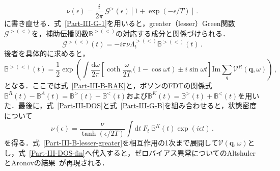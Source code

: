 \documentclass[a4paper,11pt]{ltjsarticle}
\def\d{\mathrm{d}}
\def\qo{(\mathbf{q},\omega)}
\begin{document}
\begin{equation}\label{Part-III-DOS}
\nu(\epsilon)=\frac{i}{2\pi}\ \mathcal{G}^{>}
(\epsilon)[1+\exp(-\epsilon/T)]\,.
\end{equation}
に書き直せる．式~\eqref{Part-III-G-1}を用いると，greater（lesser）Green関数$\mathcal{G}^{>(<)}$を，補助伝播関数$\mathbb{B}^{>(<)}$の対応する成分と関係づけられる．
\begin{equation}\label{Part-III-G-B}
\mathcal{G}^{>(<)}(t)=-i\pi\nu\Lambda^{>(<)}_{t}\mathbb{B}^{>(<)}(t)\,.
\end{equation}
後者を具体的に求めると，
\begin{equation}\label{Part-III-B-lesser-greater}
\mathbb{B}^{>(<)}(t)=\frac{1}{2}\exp\left(\int\frac{\d\omega}{2\pi}
\left[\coth\frac{\omega}{2T}(1-\cos\omega t)\pm i\sin\omega t\right]
\mathrm{Im}\sum_{q}\mathcal{V}^{R}\qo\right)\,,
\end{equation}
となる．ここでは式~\eqref{Part-III-B-RAK}と，ボソンのFDTの関係式$\mathbb{B}^{R}(t)-\mathbb{B}^{A}(t)=\mathbb{B}^{>}(t)-\mathbb{B}^{<}(t)$および$\mathbb{B}^{K}(t)=\mathbb{B}^{>}(t)+\mathbb{B}^{<}(t)$を用いた．最後に，式~\eqref{Part-III-DOS}と式~\eqref{Part-III-G-B}を組み合わせると，状態密度について
\begin{equation}\label{Part-III-DOS-fin}
\nu(\epsilon)=\frac{\nu}{\tanh(\epsilon/2T)}\int\d t\ F_{t}\
\mathbb{B}^{K}(t)\exp(i\epsilon t)\,.
\end{equation}
を得る．式~\eqref{Part-III-B-lesser-greater}を相互作用の1次まで展開して$\mathcal{V}\qo$とし，式~\eqref{Part-III-DOS-fin}へ代入すると，ゼロバイアス異常についてのAltshulerとAronovの結果~\cite{AltshulerAronov}が再現される．
\end{document}
